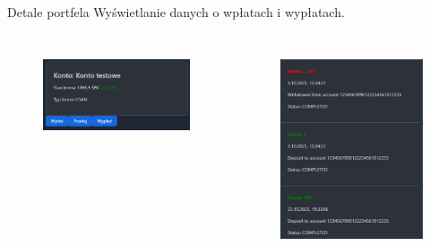 \begin{frame}{\insertsection}
	\begin{block}{Detale portfela}
		Wyświetlanie danych o wpłatach i wypłatach.
	\end{block}
	\begin{columns}
			\begin{figure}
			\centering
			\includegraphics[width=1\linewidth]{../images/DanePortfela}
			\label{fig:daneportfela}
		\end{figure}
		\begin{figure}
			\centering
			\includegraphics[width=0.9\linewidth]{../images/TransakcjeHistoria}
			\label{fig:transakcjehistoria}
		\end{figure}
		
	\end{columns}

\end{frame}

